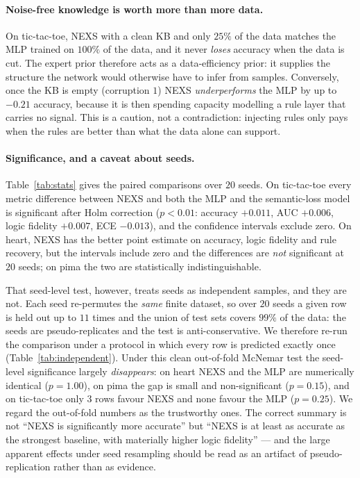 \documentclass[11pt]{article}
\newcommand{\nexs}{\textsc{NEXS}}
\begin{document}
\paragraph{Noise-free knowledge is worth more than more data.}
On tic-tac-toe, \nexs{} with a clean KB and only $25\%$ of the data matches the
MLP trained on $100\%$ of the data, and it never \emph{loses} accuracy when the
data is cut. The expert prior therefore acts as a data-efficiency prior: it
supplies the structure the network would otherwise have to infer from samples.
Conversely, once the KB is empty (corruption $1$) \nexs{} \emph{underperforms}
the MLP by up to $-0.21$ accuracy, because it is then spending capacity
modelling a rule layer that carries no signal. This is a caution, not a
contradiction: injecting rules only pays when the rules are better than what the
data alone can support.

\paragraph{Significance, and a caveat about seeds.}
Table~\ref{tab:stats} gives the paired comparisons over $20$ seeds. On
tic-tac-toe every metric difference between \nexs{} and both the MLP and the
semantic-loss model is significant after Holm correction
($p<0.01$: accuracy $+0.011$, AUC $+0.006$, logic fidelity $+0.007$, ECE
$-0.013$), and the confidence intervals exclude zero. On heart, \nexs{} has the
better point estimate on accuracy, logic fidelity and rule recovery, but the
intervals include zero and the differences are \emph{not} significant at $20$
seeds; on pima the two are statistically indistinguishable.

That seed-level test, however, treats seeds as independent samples, and they are
not. Each seed re-permutes the \emph{same} finite dataset, so over $20$ seeds a
given row is held out up to $11$ times and the union of test sets covers $99\%$
of the data: the seeds are pseudo-replicates and the test is anti-conservative.
We therefore re-run the comparison under a protocol in which every row is
predicted exactly once (Table~\ref{tab:independent}). Under this clean
out-of-fold McNemar test the seed-level significance largely \emph{disappears}:
on heart \nexs{} and the MLP are numerically identical ($p=1.00$), on pima the
gap is small and non-significant ($p=0.15$), and on tic-tac-toe only $3$ rows
favour \nexs{} and none favour the MLP ($p=0.25$). We regard the out-of-fold
numbers as the trustworthy ones. The correct summary is not ``\nexs{} is
significantly more accurate'' but ``\nexs{} is at least as accurate as the
strongest baseline, with materially higher logic fidelity'' --- and the large
apparent effects under seed resampling should be read as an artifact of
pseudo-replication rather than as evidence.
\end{document}
